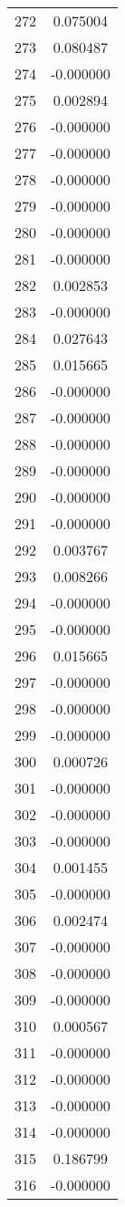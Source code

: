 \documentclass[12pt]{article}
\begin{document}
\begin{longtable}{@{}cc@{}}
272 & 0.075004 \\
273 & 0.080487 \\
274 & -0.000000 \\
275 & 0.002894 \\
276 & -0.000000 \\
277 & -0.000000 \\
278 & -0.000000 \\
279 & -0.000000 \\
280 & -0.000000 \\
281 & -0.000000 \\
282 & 0.002853 \\
283 & -0.000000 \\
284 & 0.027643 \\
285 & 0.015665 \\
286 & -0.000000 \\
287 & -0.000000 \\
288 & -0.000000 \\
289 & -0.000000 \\
290 & -0.000000 \\
291 & -0.000000 \\
292 & 0.003767 \\
293 & 0.008266 \\
294 & -0.000000 \\
295 & -0.000000 \\
296 & 0.015665 \\
297 & -0.000000 \\
298 & -0.000000 \\
299 & -0.000000 \\
300 & 0.000726 \\
301 & -0.000000 \\
302 & -0.000000 \\
303 & -0.000000 \\
304 & 0.001455 \\
305 & -0.000000 \\
306 & 0.002474 \\
307 & -0.000000 \\
308 & -0.000000 \\
309 & -0.000000 \\
310 & 0.000567 \\
311 & -0.000000 \\
312 & -0.000000 \\
313 & -0.000000 \\
314 & -0.000000 \\
315 & 0.186799 \\
316 & -0.000000 \\

\end{longtable}
\end{document}
